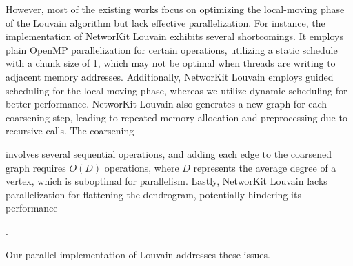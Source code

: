 However, most of the existing works focus on optimizing the local-moving phase of the Louvain algorithm but lack effective parallelization. For instance, the implementation of NetworKit Louvain exhibits several shortcomings. It employs plain OpenMP parallelization for certain operations, utilizing a static schedule with a chunk size of 1, which may not be optimal when threads are writing to adjacent memory addresses. Additionally, NetworKit Louvain employs guided scheduling for the local-moving phase, whereas we utilize dynamic scheduling for better performance. NetworKit Louvain also generates a new graph for each coarsening step, leading to repeated memory allocation and preprocessing due to recursive calls. The coarsening involves several sequential operations, and adding each edge to the coarsened graph requires $O(D)$ operations, where $D$ represents the average degree of a vertex, which is suboptimal for parallelism. Lastly, NetworKit Louvain lacks parallelization for flattening the dendrogram, potentially hindering its performance. Our parallel implementation of Louvain addresses these issues.


